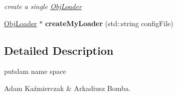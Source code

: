 \begin{DoxyCompactItemize}
\begin{DoxyCompactList}\small\item\em create a single \hyperlink{classputar_1_1ObjLoader}{Obj\+Loader} \end{DoxyCompactList}\item 
\hyperlink{classputar_1_1ObjLoader}{Obj\+Loader} $\ast$ {\bfseries create\+My\+Loader} (std\+::string config\+File)\hypertarget{namespaceputar_afcf7f746d647ed671ab7d8c0cb06e528}{}\label{namespaceputar_afcf7f746d647ed671ab7d8c0cb06e528}

\end{DoxyCompactItemize}


\subsection{Detailed Description}
putslam name space 

Adam Kaźmierczak \& Arkadiusz Bomba. 